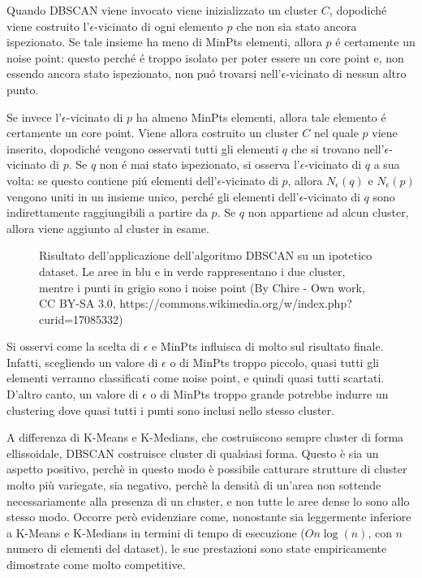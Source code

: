 \documentclass[12pt]{report}
\begin{document}
				Quando DBSCAN viene invocato viene inizializzato un cluster
				$C$, dopodiché viene costruito l'$\epsilon$-vicinato di ogni
				elemento $p$ che non sia stato ancora ispezionato. Se tale
				insieme ha meno di MinPts elementi, allora $p$ é certamente
				un noise point: questo perché é troppo isolato per poter
				essere un core point e, non essendo ancora stato ispezionato,
				non puó trovarsi nell'$\epsilon$-vicinato di nessun altro punto.

				Se invece l'$\epsilon$-vicinato di $p$ ha almeno MinPts
				elementi, allora tale elemento é certamente un core point.
				Viene allora costruito un cluster $C$ nel quale $p$ viene
				inserito, dopodiché vengono osservati tutti gli elementi
				$q$ che si trovano nell'$\epsilon$-vicinato di $p$.
				Se $q$ non é mai stato ispezionato, si osserva
				l'$\epsilon$-vicinato di $q$ a sua volta: se questo
				contiene piú elementi dell'$\epsilon$-vicinato di $p$,
				allora $N_{\epsilon}(q)$ e $N_{\epsilon}(p)$ vengono
				uniti in un insieme unico, perché gli elementi
				dell'$\epsilon$-vicinato di $q$ sono indirettamente
				raggiungibili a partire da $p$. Se $q$ non appartiene
				ad alcun cluster, allora viene aggiunto al cluster in esame.

				\begin{figure}[H]
					\centering
					
					\caption{Risultato dell'applicazione dell'algoritmo DBSCAN su un
					ipotetico dataset. Le aree in blu e in verde rappresentano i due
					cluster, mentre i punti in grigio sono i noise point (By Chire -
					Own work, CC BY-SA 3.0, https://commons.wikimedia.org/w/index.php?curid=17085332)}
					\label{fig:dbscan-density-data}
				\end{figure}

				Si osservi come la scelta di $\epsilon$ e MinPts influisca di molto
				sul risultato finale. Infatti, scegliendo un valore di $\epsilon$ o
				di MinPts troppo piccolo, quasi tutti gli elementi verranno classificati
				come noise point, e quindi quasi tutti scartati. D'altro canto, un valore
				di $\epsilon$ o di MinPts troppo grande potrebbe indurre un clustering
				dove quasi tutti i punti sono inclusi nello stesso cluster.

				A differenza di K-Means e K-Medians, che costruiscono sempre cluster
				di forma ellissoidale, DBSCAN costruisce cluster di qualsiasi forma.
				Questo è sia un aspetto positivo, perchè in questo modo è possibile
				catturare strutture di cluster molto più variegate, sia negativo,
				perchè la densità di un'area non sottende necessariamente alla
				presenza di un cluster, e non tutte le aree dense lo sono allo
				stesso modo. Occorre però evidenziare come, nonostante sia leggermente
				inferiore a K-Means e K-Medians in termini di tempo di esecuzione
				($O n \log(n)$, con $n$ numero di elementi del dataset), le sue
				prestazioni sono state empiricamente dimostrate come molto competitive.
\end{document}
